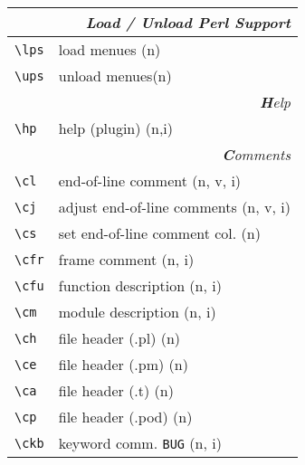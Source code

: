 \documentclass[oneside,10pt,landscape,DIV16]{scrartcl}
\begin{document}
\begin{multicols}{3}
\begin{center}
\begin{tabular}[]{|p{11mm}|p{58mm}|}
\hline
\multicolumn{2}{|r|}{\textsl{\textbf{L}oad / \textbf{U}nload Perl Support}} \\
\hline \verb'\lps'  & load menues  \hfill (n) \\
\hline \verb'\ups'  & unload menues\hfill (n) \\
\hline
\hline 
\multicolumn{2}{|r|}{\textsl{\textbf{H}elp}}\\
\hline \verb'\hp'   & help (plugin) \hfill (n,i)\\
\hline 
\hline
\multicolumn{2}{|r|}{\textsl{\textbf{C}omments}} \\
\hline \verb'\cl'  & end-of-line comment               \hfill (n, v, i)\\
\hline \verb'\cj'  & adjust end-of-line comments       \hfill (n, v, i)\\
\hline \verb'\cs'  & set end-of-line comment col.      \hfill (n)    \\
\hline \verb'\cfr' & frame comment                     \hfill (n, i)  \\
\hline \verb'\cfu' & function description              \hfill (n, i)  \\
\hline \verb'\cm'  & module description                \hfill (n, i)  \\
\hline \verb'\ch'  & file header (.pl)                 \hfill (n)    \\
\hline \verb'\ce'  & file header (.pm)                 \hfill (n)    \\
\hline \verb'\ca'  & file header (.t)                  \hfill (n)    \\
\hline \verb'\cp'  & file header (.pod)                \hfill (n)    \\
\hline \verb'\ckb' & keyword comm. \verb'BUG'          \hfill (n, i)  \\

\end{tabular}
\end{center}
\end{multicols}
\end{document}
